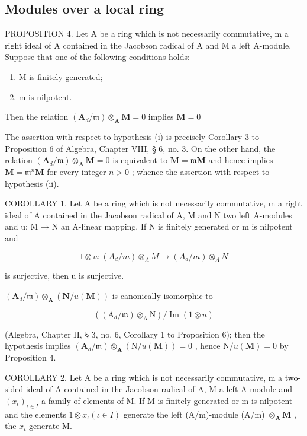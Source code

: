 \subsection{Modules over a local ring}

PROPOSITION 4. Let A be a ring which is not necessarily commutative, m a right ideal of A contained in the Jacobson radical of A and M a left A-module. Suppose that one of the following conditions holds:

\begin{enumerate}
\def\labelenumi{(\roman{enumi})}
\item
  M is finitely generated;
\item
  m is nilpotent.
\end{enumerate}

Then the relation \((\mathbf{A}_d / \mathfrak{m})\otimes_{\mathbf{A}}\mathbf{M} = 0\) implies \(\mathbf{M} = 0\)

The assertion with respect to hypothesis (i) is precisely Corollary 3 to Proposition 6 of Algebra, Chapter VIII, § 6, no. 3. On the other hand, the relation \((\mathbf{A}_d / \mathfrak{m}) \otimes_{\mathbf{A}} \mathbf{M} = 0\) is equivalent to \(\mathbf{M} = \mathfrak{m}\mathbf{M}\) and hence implies \(\mathbf{M} = \mathfrak{m}^n\mathbf{M}\) for every integer \(n > 0\) ; whence the assertion with respect to hypothesis (ii).

COROLLARY 1. Let A be a ring which is not necessarily commutative, m a right ideal of A contained in the Jacobson radical of A, M and N two left A-modules and u: M → N an A-linear mapping. If N is finitely generated or m is nilpotent and

\[
1 \otimes u: (A _ {d} / m) \otimes_ {A} M \rightarrow (A _ {d} / m) \otimes_ {A} N
\]

is surjective, then u is surjective.

\((\mathbf{A}_d / \mathfrak{m})\otimes_{\mathbf{A}}(\mathbf{N} / u(\mathbf{M}))\) is canonically isomorphic to

\[
((\mathrm{A} _ {d} / \mathfrak {m}) \otimes_ {\mathrm{A}} \mathrm{N}) / \operatorname{Im} (1 \otimes u)
\]

(Algebra, Chapter II, § 3, no. 6, Corollary 1 to Proposition 6); then the hypothesis implies \((\mathbf{A}_d / \mathfrak{m}) \otimes_{\mathbf{A}} (\mathrm{N} / u(\mathbf{M})) = 0\) , hence \(\mathrm{N} / u(\mathbf{M}) = 0\) by Proposition 4.

COROLLARY 2. Let A be a ring which is not necessarily commutative, m a two-sided ideal of A contained in the Jacobson radical of A, M a left A-module and \((x_{\iota})_{\iota \in I}\) a family of elements of M. If M is finitely generated or m is nilpotent and the elements \(1 \otimes x_{\iota} (\iota \in I)\) generate the left (A/m)-module (A/m) \(\otimes_{\mathbf{A}} \mathbf{M}\) , the \(x_{\iota}\) generate M.

